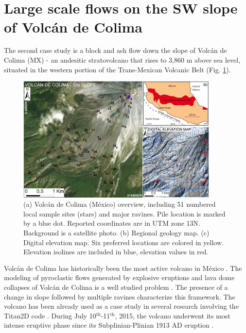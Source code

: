 \documentclass{article}
\begin{document}
\section{Large scale flows on the SW slope of Volc{\'a}n de Colima}\label{QoI2}
The second case study is a block and ash flow down the slope of Volc{\'a}n de Colima (MX) - an andesitic stratovolcano that rises to 3,860 m above sea level, situated in the western portion of the Trans-Mexican Volcanic Belt (Fig. \ref{fig:Colima-first}).
\begin{figure}[H]
    \includegraphics[width=0.9\textwidth]{BAF_VolcanDeColima/ColimaFig.jpg}
    \centering
    \caption{(a) Volc{\'a}n de Colima (M{\'e}xico) overview, including 51 numbered local sample sites (stars) and major ravines. Pile location is marked by a blue dot. Reported coordinates are in UTM zone 13N. Background is a satellite photo. (b) Regional geology map. (c) Digital elevation map. Six preferred locations are colored in yellow. Elevation isolines are included in blue, elevation values in red.}
    \label{fig:Colima-first}
\end{figure}
Volc{\'a}n de Colima has historically been the most active volcano in M{\'e}xico \citep{DeLaCruzReina1993, Zobin2002, Gonzalez2002}. The modeling of pyroclastic flows generated by explosive eruptions and lava dome collapses of Volc{\'a}n de Colima is a well studied problem \citep{DelPozzo1995,Sheridan1995,Saucedo2002,Saucedo2004,Saucedo2005,Sarocchi2011,Capra2015}. The presence of a change in slope followed by multiple ravines characterize this framework. The volcano has been already used as a case study in several research involving the Titan2D code \citep{Rupp2004, Rupp2006, Dalbey2008, Yu2009, Sulpizio2010, Capra2011, Aghakhani2016}. During July 10$^{\mathrm{th}}$-11$^{\mathrm{th}}$, 2015, the volcano underwent its most intense eruptive phase since its Subplinian-Plinian 1913 AD eruption \citep{Saucedo2010, Zobin2015, ReyesDaVilla2016, Capra2016, Macorps2017}.
\end{document}
